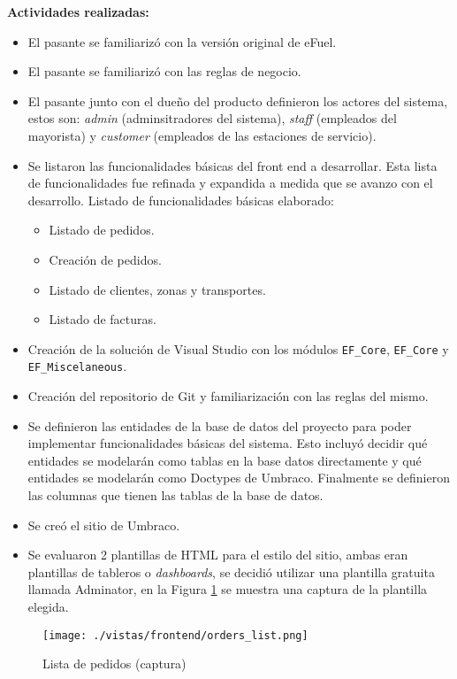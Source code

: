 \vspace{0.3cm}
\textbf{Actividades realizadas:}
\begin{itemize}
    \item El pasante se familiarizó con la versión original de eFuel.
    \item El pasante se familiarizó con las reglas de negocio.
    \item El pasante junto con el dueño del producto definieron los actores del sistema, estos son: \emph{admin} (adminsitradores del sistema), \emph{staff} (empleados del mayorista) y \emph{customer} (empleados de las estaciones de servicio).
    \item Se listaron las funcionalidades básicas del front end a desarrollar. Esta lista de funcionalidades fue refinada y expandida a medida que se avanzo con el desarrollo. Listado de funcionalidades básicas elaborado:
        \begin{itemize}
            \item Listado de pedidos.
            \item Creación de pedidos.
            \item Listado de clientes, zonas y transportes.
            \item Listado de facturas.
        \end{itemize}
    \item Creación de la solución de Visual Studio con los módulos \texttt{EF\_Core}, \texttt{EF\_Core} y \texttt{EF\_\-Miscelaneous}.
    \item Creación del repositorio de Git y familiarización con las reglas del mismo.
    \item Se definieron las entidades de la base de datos del proyecto para poder implementar funcionalidades básicas del sistema. Esto incluyó decidir qué entidades se modelarán como tablas en la base datos directamente y qué entidades se modelarán como Doctypes de Umbraco. Finalmente se definieron las columnas que tienen las tablas de la base de datos.
    \item Se creó el sitio de Umbraco.
    \item Se evaluaron 2 plantillas de HTML para el estilo del sitio, ambas eran plantillas de tableros o \emph{dashboards}, se decidió utilizar una plantilla gratuita llamada Adminator, en la Figura \ref{fig:orderslist} se muestra una captura de la plantilla elegida.
\end{itemize}

\begin{figure}[H]
    \centering
    \texttt{[image: ./vistas/frontend/orders\_list.png]}
    \caption{Lista de pedidos (captura)}
    \label{fig:orderslist}
\end{figure}

